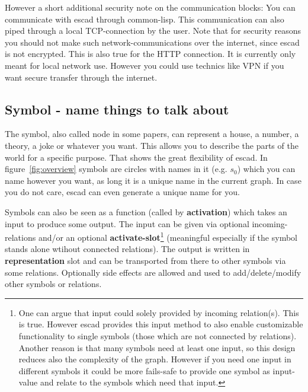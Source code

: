 \documentclass[a4paper, 12pt, openany]{scrbook}
\begin{document}
However a short additional security note on the communication blocks: You can communicate with escad through common-lisp. This communication can also piped through a local TCP-connection by the user. Note that for security reasons you should not make such network-communications over the internet, since escad is not encrypted. This is also true for the HTTP connection. It is currently only meant for local network use. However you could use technics like VPN if you want secure transfer through the internet.
\subsection{Symbol - name things to talk about}
The symbol, also called node in some papers, can represent a house, a number, a theory, a joke or whatever you want. This allows you to describe the parts of the world for a specific purpose. That shows the great flexibility of escad. In figure~\ref{fig:overview} symbols are circles with names in it (e.g. $s_0$) which you can name however you want, as long it is a unique name in the current graph. In case you do not care, escad can even generate a unique name for you.

Symbols can also be seen as a function (called by \textbf{activation}) which takes an input to produce some output. The input can be given via optional incoming-relations and/or an optional \textbf{activate-slot}\footnote{One can argue that input could solely provided by incoming relation(s). This is true. However escad provides this input method to also enable customizable functionality to single symbols (those which are not connected by relations). Another reason is that many symbols need at least one input, so this design reduces also the complexity of the graph. However if you need one input in different symbols it could be more fails-safe to provide one symbol as input-value and relate to the symbols which need that input.} (meaningful especially if the symbol stands alone wtihout connected relations). The output is written in \textbf{representation} slot and can be transported from there to other symbols via some relations. Optionally side effects are allowed and used to add/delete/modify other symbols or relations.
\end{document}
